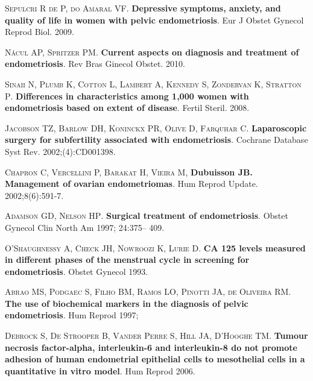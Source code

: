 \documentclass[12pt]{article} %
\begin{document}
\vspace{0,5cm}


\textsc{Sepulcri R de P, do Amaral VF}.
\textbf{Depressive symptoms, anxiety, and quality
of life in women with pelvic endometriosis}.
Eur J Obstet Gynecol Reprod Biol.
2009.

\vspace{0,5cm}


\textsc{Nácul AP, Spritzer PM}. \textbf{Current aspects on diagnosis and treatment of
endometriosis}. Rev Bras Ginecol Obstet. 2010.

\vspace{0,5cm}


\textsc{Sinaii N, Plumb K, Cotton L, Lambert A, Kennedy S, Zondervan K, Stratton P}. \textbf{Differences in characteristics among 1,000 women with endometriosis based on extent of disease}. Fertil Steril. 2008.

\vspace{0,5cm}

\textsc{Jacobson TZ, Barlow DH, Koninckx PR, Olive D, Farquhar C}.\textbf{ Laparoscopic surgery for subfertility associated with endometriosis}. Cochrane Database Syst Rev. 2002;(4):CD001398.

\vspace{0,5cm}


\textsc{Chapron C, Vercellini P, Barakat H, Vieira M}, \textbf{Dubuisson JB. Management of ovarian endometriomas}. Hum Reprod Update. 2002;8(6):591-7.

\textsc{Adamson GD, Nelson HP}. \textbf{Surgical treatment of endometriosis}. Obstet Gynecol Clin North Am 1997; 24:375– 409. 

\vspace{0,5cm}

\textsc{O'Shaughnessy A, Check JH, Nowroozi K, Lurie D}.
\textbf{CA 125 levels measured in different phases of the menstrual cycle in screening for endometriosis}. Obstet Gynecol 1993.

\vspace{0,5cm}

\textsc{Abrao MS, Podgaec S, Filho BM, Ramos LO, Pinotti JA, de Oliveira RM}.\textbf{ The use of biochemical markers in the diagnosis of pelvic endometriosis}. Hum Reprod 1997;

\vspace{0,5cm}

\textsc{Debrock S, De Strooper B, Vander Perre S, Hill JA, D'Hooghe TM}.
\textbf{Tumour necrosis factor-alpha, interleukin-6 and interleukin-8 do not promote adhesion of human endometrial epithelial cells to mesothelial cells in a quantitative in vitro model}. Hum Reprod 2006.
\end{document}

